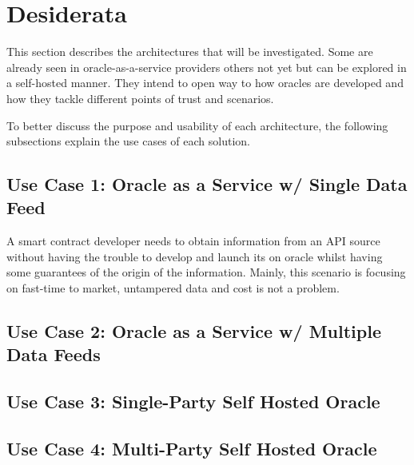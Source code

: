 \section{Desiderata}

This section describes the architectures that will be investigated. Some are already seen in oracle-as-a-service providers others not yet but can be explored in a self-hosted manner. They intend to open way to how oracles are developed and how they tackle different points of trust and scenarios.

To better discuss the purpose and usability of each architecture, the following subsections explain the use cases of each solution.

\subsection{Use Case 1: Oracle as a Service w/ Single Data Feed}

A smart contract developer needs to obtain information from an API source without having the trouble to develop and launch its on oracle whilst having some guarantees of the origin of the information. Mainly, this scenario is focusing on fast-time to market, untampered data and cost is not a problem.

\subsection{Use Case 2: Oracle as a Service w/ Multiple Data Feeds}

\subsection{Use Case 3: Single-Party Self Hosted Oracle}

\subsection{Use Case 4: Multi-Party Self Hosted Oracle}